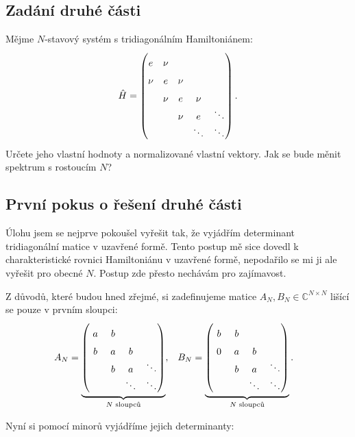 \documentclass[10pt,a4paper]{article}
\def\ph{\phantom}
\def\vph{\vphantom}
\newcommand{\mat}[1]{
    \begin{pmatrix}
        #1
    \end{pmatrix}
}
\begin{document}
\subsection{Zadání druhé části}
Mějme $N$-stavový systém s tridiagonálním Hamiltoniánem:
\begin{align*}
    \hat H = \mat{
        e   & \nu & \vph{\ddots} \\
        \nu & e   & \nu & \vph{\ddots} \\
            & \nu & e   & \nu & \vph{\ddots} \\
            &     & \nu & e   & \ddots \\
            &     &     & \ddots & \ddots
    }.
\end{align*}
Určete jeho vlastní hodnoty a normalizované vlastní vektory. Jak se bude měnit spektrum s rostoucím $N$?

\subsection{První pokus o řešení druhé části}
Úlohu jsem se nejprve pokoušel vyřešit tak, že vyjádřím determinant tridiagonální matice v uzavřené formě. Tento postup mě sice dovedl k charakteristické rovnici Hamiltoniánu v uzavřené formě, nepodařilo se mi ji ale vyřešit pro obecné $N$. Postup zde přesto nechávám pro zajímavost.

\bigskip

Z důvodů, které budou hned zřejmé, si zadefinujeme matice $A_N, B_N \in \mathbb{C}^{N \times N}$ lišící se pouze v prvním sloupci:
\begin{align*}
    &A_N =
    \underbrace{
        \mat{
            a & b & \vph{\ddots} \\
            b & a & b & \vph{\ddots} \\
                & b & a   & \ddots \\
            \ph{\ddots} &     & \ddots & \ddots
        }
    }_{N \text{ sloupců}},
    &
    &B_N =
    \underbrace{
        \mat{
            b & b & \vph{\ddots} \\
            0 & a & b & \vph{\ddots} \\
                & b & a   & \ddots \\
            \ph{\ddots} &     & \ddots & \ddots
        }
    }_{N \text{ sloupců}}.
\end{align*}

Nyní si pomocí minorů vyjádříme jejich determinanty:
\end{document}
